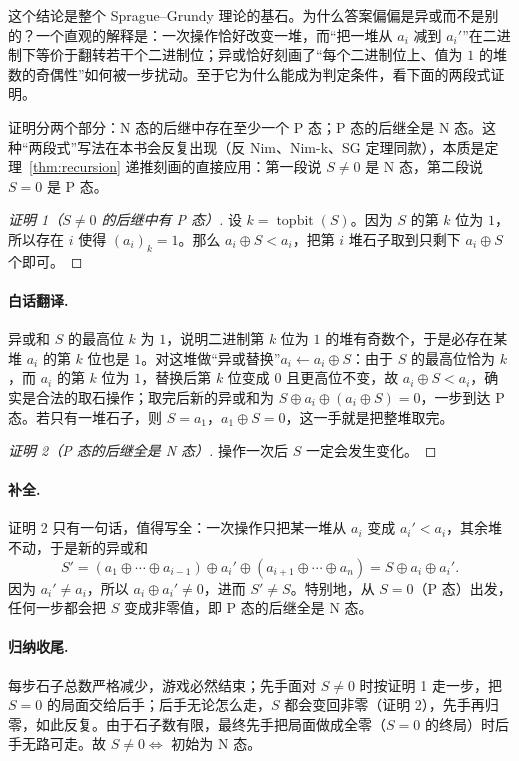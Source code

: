 \documentclass[UTF8,a4paper,11pt,oneside,openany,fontset=fandol]{ctexbook}
\theoremstyle{definition}
\newcommand{\topbit}{\operatorname{topbit}}
\begin{document}
这个结论是整个 Sprague--Grundy 理论的基石。为什么答案偏偏是异或而不是别的？一个直观的解释是：一次操作恰好改变一堆，而“把一堆从 $a_i$ 减到 $a_i'$”在二进制下等价于翻转若干个二进制位；异或恰好刻画了“每个二进制位上、值为 $1$ 的堆数的奇偶性”如何被一步扰动。至于它为什么能成为判定条件，看下面的两段式证明。

证明分两个部分：N 态的后继中存在至少一个 P 态；P 态的后继全是 N 态。这种“两段式”写法在本书会反复出现（反 Nim、Nim-k、SG 定理同款），本质是定理~\ref{thm:recursion} 递推刻画的直接应用：第一段说 $S\ne0$ 是 N 态，第二段说 $S=0$ 是 P 态。

\begin{proof}[证明 1（$S\ne0$ 的后继中有 P 态）]
设 $k=\topbit(S)$。因为 $S$ 的第 $k$ 位为 $1$，所以存在 $i$ 使得 $(a_i)_k=1$。那么 $a_i\oplus S<a_i$，把第 $i$ 堆石子取到只剩下 $a_i\oplus S$ 个即可。
\end{proof}

\paragraph{白话翻译.} 异或和 $S$ 的最高位 $k$ 为 $1$，说明二进制第 $k$ 位为 $1$ 的堆有奇数个，于是必存在某堆 $a_i$ 的第 $k$ 位也是 $1$。对这堆做“异或替换”$a_i\leftarrow a_i\oplus S$：由于 $S$ 的最高位恰为 $k$，而 $a_i$ 的第 $k$ 位为 $1$，替换后第 $k$ 位变成 $0$ 且更高位不变，故 $a_i\oplus S<a_i$，确实是合法的取石操作；取完后新的异或和为 $S\oplus a_i\oplus(a_i\oplus S)=0$，一步到达 P 态。若只有一堆石子，则 $S=a_1$，$a_1\oplus S=0$，这一手就是把整堆取完。

\begin{proof}[证明 2（P 态的后继全是 N 态）]
操作一次后 $S$ 一定会发生变化。
\end{proof}
\paragraph{补全.} 证明 2 只有一句话，值得写全：一次操作只把某一堆从 $a_i$ 变成 $a_i'<a_i$，其余堆不动，于是新的异或和
\[
 S'=(a_1\oplus\cdots\oplus a_{i-1})\oplus a_i'\oplus(a_{i+1}\oplus\cdots\oplus a_n)=S\oplus a_i\oplus a_i'.
\]
因为 $a_i'\ne a_i$，所以 $a_i\oplus a_i'\ne0$，进而 $S'\ne S$。特别地，从 $S=0$（P 态）出发，任何一步都会把 $S$ 变成非零值，即 P 态的后继全是 N 态。

\paragraph{归纳收尾.} 每步石子总数严格减少，游戏必然结束；先手面对 $S\ne0$ 时按证明 1 走一步，把 $S=0$ 的局面交给后手；后手无论怎么走，$S$ 都会变回非零（证明 2），先手再归零，如此反复。由于石子数有限，最终先手把局面做成全零（$S=0$ 的终局）时后手无路可走。故 $S\ne0\iff$ 初始为 N 态。
\end{document}
